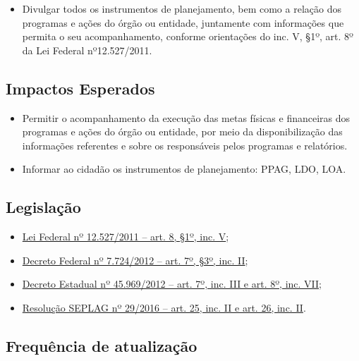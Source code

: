 \documentclass[
]{book}
\providecommand{\tightlist}{%
  \setlength{\itemsep}{0pt}\setlength{\parskip}{0pt}}
\begin{document}
\begin{itemize}
\tightlist
\item
  Divulgar todos os instrumentos de planejamento, bem como a relação dos programas e ações do órgão ou entidade, juntamente com informações que permita o seu acompanhamento, conforme orientações do inc. V, §1º, art. 8º da Lei Federal nº12.527/2011.
\end{itemize}

\hypertarget{impactos-esperados-3}{%
\subsection{Impactos Esperados}\label{impactos-esperados-3}}

\begin{itemize}
\tightlist
\item
  Permitir o acompanhamento da execução das metas físicas e financeiras dos programas e ações do órgão ou entidade, por meio da disponibilização das informações referentes e sobre os responsáveis pelos programas e relatórios.
\item
  Informar ao cidadão os instrumentos de planejamento: PPAG, LDO, LOA.
\end{itemize}

\hypertarget{legislauxe7uxe3o-3}{%
\subsection{Legislação}\label{legislauxe7uxe3o-3}}

\begin{itemize}
\tightlist
\item
  \href{http://www.planalto.gov.br/ccivil_03/_ato2011-2014/2011/lei/l12527.htm\#art8}{Lei Federal nº 12.527/2011 -- art. 8, §1º, inc. V};
\item
  \href{http://www.planalto.gov.br/ccivil_03/_ato2011-2014/2012/decreto/d7724.htm}{Decreto Federal nº 7.724/2012 -- art. 7º, §3º, inc. II};
\item
  \href{https://www.almg.gov.br/consulte/legislacao/completa/completa.html?tipo=DEC\&num=45969\&ano=2012}{Decreto Estadual nº 45.969/2012 -- art. 7º, inc. III e art. 8º, inc. VII};
\item
  \href{http://www.planejamento.mg.gov.br/sites/default/files/documentos/resolucao_sitios_seplag_29_de_05_07_2016_1.pdf}{Resolução SEPLAG nº 29/2016 -- art. 25, inc. II e art. 26, inc. II}.
\end{itemize}

\hypertarget{frequuxeancia-de-atualizauxe7uxe3o-2}{%
\subsection{Frequência de atualização}\label{frequuxeancia-de-atualizauxe7uxe3o-2}}
\end{document}

